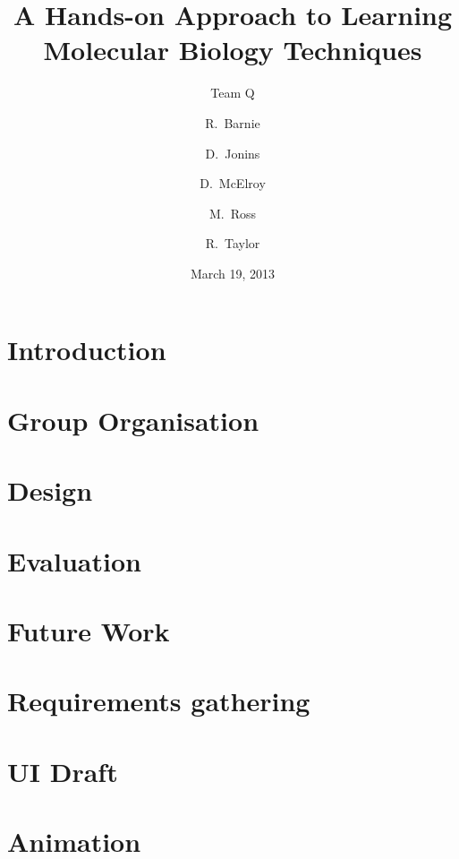 \documentclass{beamer}
\title[PCR]{A Hands-on Approach to Learning Molecular Biology Techniques}
\subtitle{Team Q}
\author{R.~Barnie \and D.~Jonins \and D.~McElroy \and M.~Ross \and R.~Taylor}
\date{March 19, 2013}
\begin{document}
\section{Introduction}


\section{Group Organisation}


\section{Design}



\section{Evaluation}




\section{Future Work}


\section{Requirements gathering}


\section{UI Draft}


\section{Animation}

\end{document}
